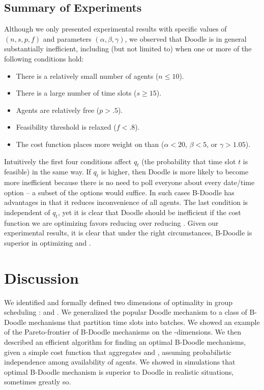 
\subsection{Summary of Experiments}
Although we only presented experimental results with specific values of $(n, s, p, f)$ and parameters $(\alpha, \beta, \gamma)$, we observed that Doodle is in general substantially inefficient, including (but not limited to) when one or more of the following conditions hold:
\begin{itemize} 
	\item There is a relatively small number of agents ($n \leq 10$).
	\item There is a large number of time slots ($s \geq 15$).
	\item Agents are relatively free ($p > .5$).
	\item Feasibility threshold is relaxed ($f < .8$).
	\item The cost function places more weight on \Inconveniences than \Times ($\alpha < 20$, $\beta < 5$, or $\gamma > 1.05$).
\end{itemize}

Intuitively the first four conditions affect $q_t$ (the probability that time slot $t$ is feasible) in the same way. If $q_t$ is higher, then Doodle is more likely to become more inefficient because there is no need to poll everyone about every date/time option -- a subset of the options would suffice. In such cases B-Doodle has advantages in that it reduces inconvenience of all agents. The last condition is independent of $q_t$, yet it is clear that Doodle should be inefficient if the cost function we are optimizing favors reducing \Inconveniences over reducing \Time. Given our experimental results, it is clear that under the right circumstances, B-Doodle is superior in optimizing \Times and \Inconvenience. 


\section{Discussion} \label{bdoodle:sec:Discussion}

We identified and formally defined two dimensions of optimality in
group scheduling : \Times and \Inconvenience. We generalized the popular
Doodle mechanism to a class of B-Doodle mechanisms that partition time
slots into batches. We showed an example of the Pareto-frontier of
B-Doodle mechanisms on the \Time-\Inconveniences dimensions. We then
described an efficient algorithm for finding an optimal B-Doodle
mechanisms, given a simple cost function that aggregates \Times and
\Inconvenience, assuming probabilistic independence among availability 
of agents. We showed in simulations that optimal B-Doodle mechanism 
is superior to Doodle in realistic situations, sometimes greatly so.


